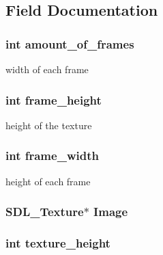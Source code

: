 \subsection{Field Documentation}
\hypertarget{struct___image_a2a2e85b75bd743d491247027f5ff7a21}{
\subsubsection[{amount\+\_\+of\+\_\+frames}]{\setlength{\rightskip}{0pt plus 5cm}int amount\+\_\+of\+\_\+frames}}\label{struct___image_a2a2e85b75bd743d491247027f5ff7a21}
width of each frame \hypertarget{struct___image_ac2614f43e36df461d5e4729be3ad04b4}{
\subsubsection[{frame\+\_\+height}]{\setlength{\rightskip}{0pt plus 5cm}int frame\+\_\+height}}\label{struct___image_ac2614f43e36df461d5e4729be3ad04b4}
height of the texture \hypertarget{struct___image_a4f1bbe063dc390226d56e9eb79afc663}{
\subsubsection[{frame\+\_\+width}]{\setlength{\rightskip}{0pt plus 5cm}int frame\+\_\+width}}\label{struct___image_a4f1bbe063dc390226d56e9eb79afc663}
height of each frame \hypertarget{struct___image_a97b32deb280734d771eb91b82a2251a3}{
\subsubsection[{Image}]{\setlength{\rightskip}{0pt plus 5cm}S\+D\+L\+\_\+\+Texture$\ast$ {\bf Image}}}\label{struct___image_a97b32deb280734d771eb91b82a2251a3}
\hypertarget{struct___image_a22e910452b37a1bcd9b35c927236af20}{
\subsubsection[{texture\+\_\+height}]{\setlength{\rightskip}{0pt plus 5cm}int texture\+\_\+height}}\label{struct___image_a22e910452b37a1bcd9b35c927236af20}
